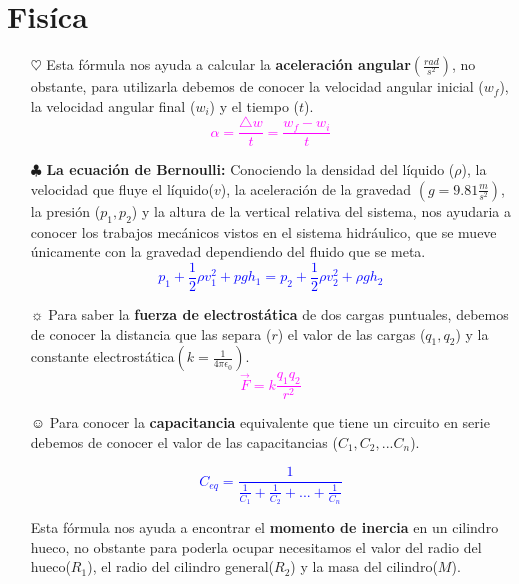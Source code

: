 \documentclass[letterpaper,12pt]{article}
\begin{document}
\hspace{3.5cm}{\textbf{\huge\textsf{\textcolor{cyan}{La} 
\textcolor{red}{receta} \textcolor{RubineRed}{de la} \textcolor{YellowOrange}{perdición}}}}
\section{Fisíca}
\begin{itemize}
    \item[$\heartsuit$] Esta fórmula nos ayuda a calcular la {\textbf{aceleración angular}}$ \left(\frac{rad}{s^{2}}\right)$, no obstante, para utilizarla debemos de conocer la velocidad angular inicial ($w_f$), la velocidad angular final ($w_i$) y el tiempo ($t$).
    \textcolor{magenta}{$$\alpha= \frac{\triangle w}{t}= \frac{w_f-w_i}{t}$$}

    \item[$\clubsuit$]{\textbf {La ecuación de Bernoulli:}} Conociendo la densidad del líquido ($\rho$), la velocidad que fluye el líquido($v$), la aceleración de la gravedad $\left(g=9.81\frac{m}{s^{2}}\right
    )$, la presión ($p_1,p_2$) y la altura de la vertical relativa del sistema, nos ayudaria a conocer los trabajos mecánicos vistos en el sistema hidráulico, que se mueve únicamente con la gravedad dependiendo del fluido que se meta.
    \textcolor{blue}{$$p_1+\frac{1}{2}\rho v^{2}_1+pgh_1=p_2+\frac{1}{2}\rho v^{2}_2+\rho gh_2$$}
    
    \item[$\sun$] Para saber la {\textbf{fuerza de electrostática}} de dos cargas puntuales, debemos de conocer la distancia que las separa ($r$) el valor de las cargas ($  q_1,q_2$) y la constante electrostática$\left (k=\frac{1}{4 \pi \epsilon_0}\right)$.
    \textcolor{magenta}{$$\vec{F}=k\frac{q_1q_2}{r^{2}}$$}
    
    \item[$\smiley$]Para conocer la {\textbf{capacitancia}} equivalente que tiene un circuito en serie debemos de conocer el valor de las capacitancias ($C_1, C_2,...C_n$).
    
    \textcolor{blue}{$$C_{eq}=\frac{1}{\frac{1}{C_1}+\frac{1}{C_2}+...+\frac{1}{C_n}}$$}
    
    \item[\textmusicalnote]Esta fórmula nos ayuda a encontrar el {\textbf{momento de inercia}} en un cilindro hueco, no obstante para poderla ocupar necesitamos el valor del radio del hueco($R_1$), el radio del cilindro general($R_2$) y la masa del cilindro($M$).
    

\end{itemize}
\end{document}
